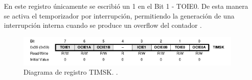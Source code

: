 En este registro únicamente se escribió un 1 en el Bit 1 - TOIE0. De esta manera se activa el temporizador por interrupción, permitiendo la generación de una interrupción interna cuando se produce un overflow del contador \cite{datasheet}.

\begin{figure}[H]
\centering
\includegraphics[scale=1]{./images/TIMSK.png} 
\caption{Diagrama de registro TIMSK. \cite{datasheet}.}
\label{f1}
\end{figure}